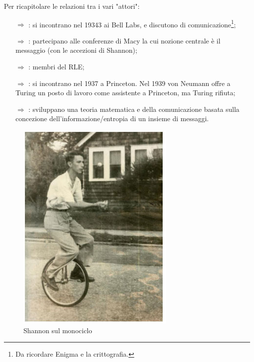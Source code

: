 \subsubsection{}

Per ricapitolare le relazioni tra i vari "attori":

\begin{itemize}
    \item [$\Rightarrow$] : si incontrano nel 19343 ai Bell Labs, e discutono di comunicazione\footnote{Da ricordare Enigma e la crittografia.};
    \item [$\Rightarrow$] : partecipano alle conferenze di Macy la cui nozione centrale è il messaggio (con le accezioni di Shannon);
    \item [$\Rightarrow$] : membri del RLE;
    \item [$\Rightarrow$] : si incontrano nel 1937 a Princeton. Nel 1939 von Neumann offre a Turing un posto di lavoro come assistente a Princeton, ma Turing rifiuta;
    \item [$\Rightarrow$] : sviluppano una teoria matematica e della comunicazione basata sulla concezione dell'informazione/entropia di un insieme di messaggi.
\end{itemize}


\begin{figure}[h]
    \centering
    \includegraphics[scale=0.35]{images/Shannon monocycle.jpg}
    \caption{Shannon sul monociclo}
\end{figure}

